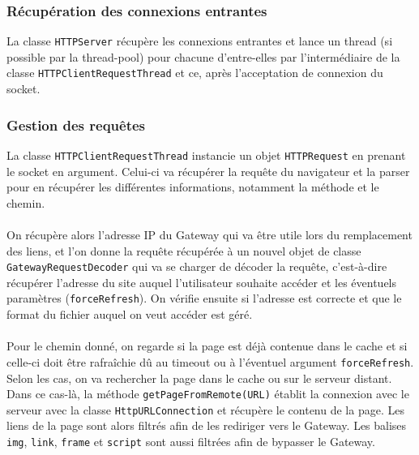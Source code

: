 \documentclass[a4paper,11pt]{article}
\begin{document}
	\subsubsection{Récupération des connexions entrantes}
La classe \texttt{HTTPServer} récupère les connexions entrantes et lance un thread (si possible par la thread-pool) pour chacune d'entre-elles par l'intermédiaire de la classe \texttt{HTTPClientRequestThread} et ce, après l'acceptation de connexion du socket.

	\subsubsection{Gestion des requêtes}
	La classe \texttt{HTTPClientRequestThread} instancie un objet \texttt{HTTPRequest} en prenant le socket en argument. Celui-ci va récupérer la requête du navigateur et la parser pour en récupérer les différentes informations, notamment la méthode et le chemin.

\paragraph{}

On récupère alors l'adresse IP du Gateway qui va être utile lors du remplacement des liens, et l'on donne la requête récupérée à un nouvel objet de classe \texttt{GatewayRequestDecoder} qui va se charger de décoder la requête, c'est-à-dire récupérer l'adresse du site auquel l'utilisateur souhaite accéder et les éventuels paramètres (\texttt{forceRefresh}). On vérifie ensuite si l'adresse est correcte et que le format du fichier auquel on veut accéder est géré.

\paragraph{}

Pour le chemin donné, on regarde si la page est déjà contenue dans le cache et si celle-ci doit être rafraîchie dû au timeout ou à l'éventuel argument \texttt{forceRefresh}. Selon les cas, on va rechercher la page dans le cache ou sur le serveur distant. Dans ce cas-là, la méthode \texttt{getPageFromRemote(URL)} établit la connexion avec le serveur avec la classe \texttt{HttpURLConnection} et récupère le contenu de la page. Les liens de la page sont alors filtrés afin de les rediriger vers le Gateway. Les balises \texttt{img}, \texttt{link}, \texttt{frame} et \texttt{script} sont aussi filtrées afin de bypasser le Gateway. 
\end{document}
